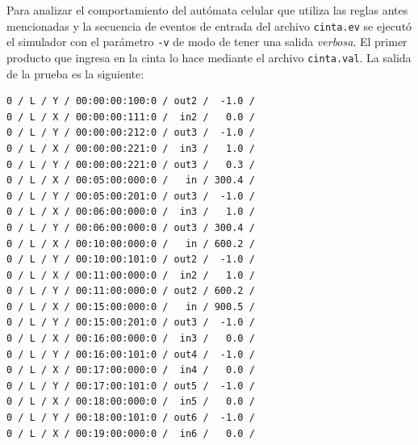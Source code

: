 \documentclass[10pt]{article}
\begin{document}
Para analizar el comportamiento del autómata celular que utiliza las reglas antes mencionadas y la secuencia de eventos de entrada del archivo \texttt{cinta.ev} se ejecutó el simulador con el parámetro \texttt{-v} de modo de tener una salida \textit{verbosa}. El primer producto que ingresa en la cinta lo hace mediante el archivo \texttt{cinta.val}. La salida de la prueba es la siguiente:

\begin{minipage}{1\textwidth}
	\centering
	\begin{lstlisting}
0 / L / Y / 00:00:00:100:0 / out2 /  -1.0 /
0 / L / X / 00:00:00:111:0 /  in2 /   0.0 /
0 / L / Y / 00:00:00:212:0 / out3 /  -1.0 /
0 / L / X / 00:00:00:221:0 /  in3 /   1.0 /
0 / L / Y / 00:00:00:221:0 / out3 /   0.3 /
0 / L / X / 00:05:00:000:0 /   in / 300.4 /
0 / L / Y / 00:05:00:201:0 / out3 /  -1.0 /
0 / L / X / 00:06:00:000:0 /  in3 /   1.0 /
0 / L / Y / 00:06:00:000:0 / out3 / 300.4 /
0 / L / X / 00:10:00:000:0 /   in / 600.2 /
0 / L / Y / 00:10:00:101:0 / out2 /  -1.0 /
0 / L / X / 00:11:00:000:0 /  in2 /   1.0 /
0 / L / Y / 00:11:00:000:0 / out2 / 600.2 /
0 / L / X / 00:15:00:000:0 /   in / 900.5 /
0 / L / Y / 00:15:00:201:0 / out3 /  -1.0 /
0 / L / X / 00:16:00:000:0 /  in3 /   0.0 /
0 / L / Y / 00:16:00:101:0 / out4 /  -1.0 /
0 / L / X / 00:17:00:000:0 /  in4 /   0.0 /
0 / L / Y / 00:17:00:101:0 / out5 /  -1.0 /
0 / L / X / 00:18:00:000:0 /  in5 /   0.0 /
0 / L / Y / 00:18:00:101:0 / out6 /  -1.0 /
0 / L / X / 00:19:00:000:0 /  in6 /   0.0 /
	\end{lstlisting}	
\end{minipage}
\end{document}

